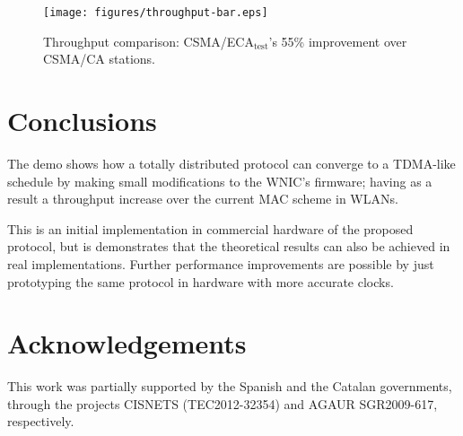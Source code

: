 \documentclass[conference]{IEEEtran}
\begin{document}
	
	\begin{figure}[htbp]
		\centering
		\texttt{[image: figures/throughput-bar.eps]}
		\caption{Throughput comparison: CSMA/ECA$_{\text{test}}$'s 55\% improvement over CSMA/CA stations.}
		\label{fig:throughput}
	\end{figure}

\section{Conclusions}
The demo shows how a totally distributed protocol can converge to a TDMA-like schedule by making small modifications to the WNIC's firmware; having as a result a throughput increase over the current MAC scheme in WLANs.

This is an initial implementation in commercial hardware of the proposed protocol, but is demonstrates that the theoretical results can also be achieved in real implementations. Further performance improvements are possible by just prototyping the same protocol in hardware with more accurate clocks.

\section{Acknowledgements}
This work was partially supported by the Spanish and the Catalan governments, through the projects CISNETS (TEC2012-32354) and AGAUR SGR2009-617, respectively.



\end{document}

